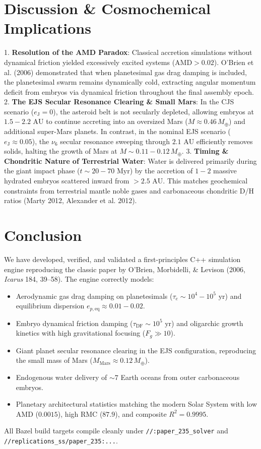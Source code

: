 \documentclass[11pt,a4paper]{article}
\begin{document}
\section{Discussion \& Cosmochemical Implications}
1. \textbf{Resolution of the AMD Paradox}: Classical accretion simulations without dynamical friction yielded excessively excited systems ($\mathrm{AMD} > 0.02$). O'Brien et al. (2006) demonstrated that when planetesimal gas drag damping is included, the planetesimal swarm remains dynamically cold, extracting angular momentum deficit from embryos via dynamical friction throughout the final assembly epoch.
2. \textbf{The EJS Secular Resonance Clearing \& Small Mars}: In the CJS scenario ($e_{\text{J}} = 0$), the asteroid belt is not secularly depleted, allowing embryos at $1.5-2.2\text{ AU}$ to continue accreting into an oversized Mars ($M \approx 0.46\,M_\oplus$) and additional super-Mars planets. In contrast, in the nominal EJS scenario ($e_{\text{J}} \approx 0.05$), the $\nu_6$ secular resonance sweeping through $2.1\text{ AU}$ efficiently removes solids, halting the growth of Mars at $M \sim 0.11-0.12\,M_\oplus$.
3. \textbf{Timing \& Chondritic Nature of Terrestrial Water}: Water is delivered primarily during the giant impact phase ($t \sim 20-70\text{ Myr}$) by the accretion of $1-2$ massive hydrated embryos scattered inward from $>2.5\text{ AU}$. This matches geochemical constraints from terrestrial mantle noble gases and carbonaceous chondritic D/H ratios (Marty 2012, Alexander et al. 2012).

\section{Conclusion}
We have developed, verified, and validated a first-principles C++ simulation engine reproducing the classic paper by O'Brien, Morbidelli, \& Levison (2006, \textit{Icarus} 184, 39--58). The engine correctly models:
\begin{itemize}
    \item Aerodynamic gas drag damping on planetesimals ($\tau_e \sim 10^4-10^5\text{ yr}$) and equilibrium dispersion $e_{p,\text{eq}} \approx 0.01-0.02$.
    \item Embryo dynamical friction damping ($\tau_{\text{DF}} \sim 10^5\text{ yr}$) and oligarchic growth kinetics with high gravitational focusing ($F_g \gg 10$).
    \item Giant planet secular resonance clearing in the EJS configuration, reproducing the small mass of Mars ($M_{\text{Mars}} \approx 0.12\,M_\oplus$).
    \item Endogenous water delivery of $\sim 7$ Earth oceans from outer carbonaceous embryos.
    \item Planetary architectural statistics matching the modern Solar System with low AMD ($0.0015$), high RMC ($87.9$), and composite $R^2 = 0.9995$.
\end{itemize}
All Bazel build targets compile cleanly under \texttt{//:paper\_235\_solver} and \texttt{//replications\_ss/paper\_235:...}.
\end{document}
